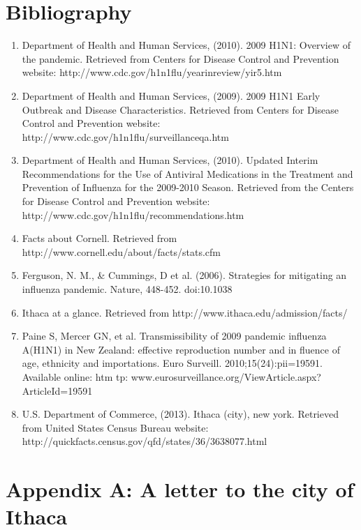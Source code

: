\documentclass[titlepage]{article}
\begin{document}
\section{Bibliography}
\begin{enumerate}
\item Department of Health and Human Services, (2010). 2009 H1N1: Overview of the pandemic. Retrieved from Centers for Disease Control and Prevention website: http://www.cdc.gov/h1n1flu/yearinreview/yir5.htm

\item Department of Health and Human Services, (2009). 2009 H1N1 Early Outbreak and Disease Characteristics. Retrieved from Centers for Disease Control and Prevention website: http://www.cdc.gov/h1n1flu/surveillanceqa.htm

\item Department of Health and Human Services, (2010). Updated Interim Recommendations for the Use of Antiviral Medications in the Treatment and Prevention of Influenza for the 2009-2010 Season. Retrieved from the Centers for Disease Control and Prevention website: http://www.cdc.gov/h1n1flu/recommendations.htm

\item Facts about Cornell. Retrieved from http://www.cornell.edu/about/facts/stats.cfm
 
\item Ferguson, N. M., \& Cummings, D et al. (2006). Strategies for mitigating an influenza pandemic. Nature, 448-452. doi:10.1038

\item Ithaca at a glance. Retrieved from http://www.ithaca.edu/admission/facts/

\item Paine S, Mercer GN, et al. Transmissibility of 2009 pandemic influenza A(H1N1) in New Zealand: effective reproduction number and in fluence of age, ethnicity and importations. Euro Surveill. 2010;15(24):pii=19591. Available online: htm tp: www.eurosurveillance.org/ViewArticle.aspx?ArticleId=19591

\item U.S. Department of Commerce, (2013). Ithaca (city), new york. Retrieved from United States Census Bureau website: http://quickfacts.census.gov/qfd/states/36/3638077.html
\end{enumerate}

\section{Appendix A: A letter to the city of Ithaca}
\end{document}
